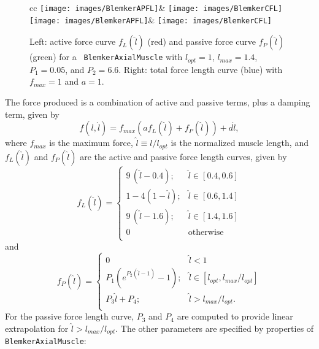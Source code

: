 \begin{figure}[ht]
\begin{center}
\begin{tabular}{cc}
   \iflatexml
      \texttt{[image: images/BlemkerAPFL]}&
      \texttt{[image: images/BlemkerCFL]}
   \else
      \texttt{[image: images/BlemkerAPFL]}&
      \texttt{[image: images/BlemkerCFL]}
   \fi
\end{tabular}
\end{center}
\caption{Left: active force curve $f_L(\hat l)$ (red) and 
passive force curve $f_P(\hat l)$ (green) for a {\tt
BlemkerAxialMuscle} with $l_{opt} = 1$, $l_{max} = 1.4$, $P_1 = 0.05$,
and $P_2 = 6.6$. Right: total force length curve (blue) with 
$f_{max} = 1$ and $a = 1$.}
\label{BlemkerCurves:fig}
\end{figure}

The force produced is a combination of active and passive terms,
plus a damping term, given by
%
\begin{equation}
f(l, \dot l) = 
f_{max} \left( a f_L (\hat l) + f_P (\hat l) \right) + d \dot l,
\label{BlemkerAxialMaterial:eqn}
\end{equation}
%
where $f_{max}$ is the maximum force, $\hat l \equiv l/l_{opt}$ is the
normalized muscle length, and
$f_L (\hat l)$ and $f_P(\hat l)$ are the active and passive
force length curves, given by
%
\begin{equation}
f_L (\hat l) = 
\begin{cases}
9 \, (\hat l - 0.4); & \hat l \in [0.4, 0.6] \\
1 - 4 (1 - \hat l); & \hat l \in [0.6, 1.4] \\
9 \, (\hat l - 1.6); & \hat l \in [1.4, 1.6] \\
0 & \mathrm{otherwise} \\
\end{cases}
\end{equation}
%
and
%
\begin{equation}
f_P (\hat l) = 
\begin{cases}
0 & \hat l < 1 \\
P_1 (e^{P_2 (\hat l-1)}-1); & \hat l \in [l_{opt}, l_{max}/l_{opt}]\\
P_3 \hat l + P_4; & \hat l > l_{max}/l_{opt}. \\
\end{cases}
\label{BlemkerPassive:eqn}
\end{equation}
%
For the passive force length curve, $P_3$ and $P_4$ are computed to
provide linear extrapolation for $\hat l > l_{max}/l_{opt}$. The other
parameters are specified by properties of {\tt BlemkerAxialMuscle}:

